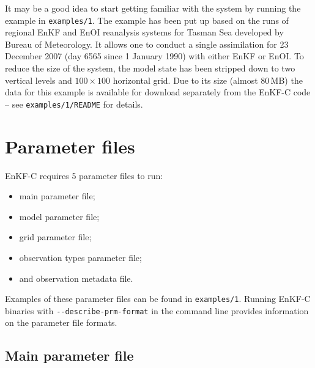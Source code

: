 \documentclass[11pt]{report}
\begin{document}
It may be a good idea to start getting familiar with the system by running the example in \verb|examples/1|.
The example has been put up based on the runs of regional EnKF and EnOI reanalysis systems for Tasman Sea developed by Bureau of Meteorology. 
It allows one to conduct a single assimilation for 23 December 2007 (day 6565 since 1 January 1990) with either EnKF or EnOI.
To reduce the size of the system, the model state has been stripped down to two vertical levels and $100 \times 100$ horizontal grid.
Due to its size (almost 80\,MB) the data for this example is available for download separately from the EnKF-C code -- see \verb|examples/1/README| for details.

\section{Parameter files}

EnKF-C requires 5 parameter files to run:
\begin{itemize} 
\item main parameter file;
\item model parameter file;
\item grid parameter file;
\item observation types parameter file;
\item and observation metadata file.
\end{itemize}
Examples of these parameter files can be found in \verb|examples/1|.
Running EnKF-C binaries with \verb|--describe-prm-format| in the command line provides information on the parameter file formats.

\subsection{Main parameter file}
\end{document}

